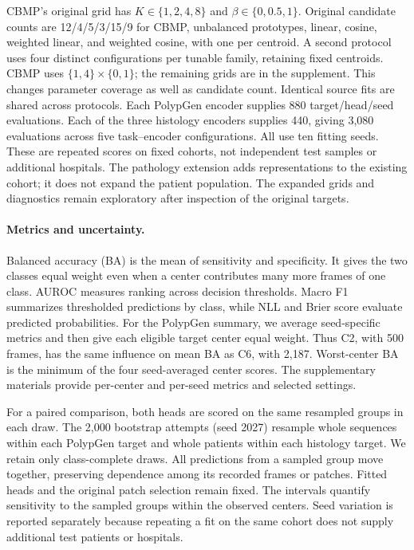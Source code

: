 CBMP's original grid has $K\in\{1,2,4,8\}$ and $\beta\in\{0,0.5,1\}$. Original candidate counts are 12/4/5/3/15/9 for CBMP, unbalanced prototypes, linear, cosine, weighted linear, and weighted cosine, with one per centroid. A second protocol uses four distinct configurations per tunable family, retaining fixed centroids. CBMP uses $\{1,4\}\times\{0,1\}$; the remaining grids are in the supplement. This changes parameter coverage as well as candidate count. Identical source fits are shared across protocols. Each PolypGen encoder supplies 880 target/head/seed evaluations. Each of the three histology encoders supplies 440, giving 3,080 evaluations across five task--encoder configurations. All use ten fitting seeds. These are repeated scores on fixed cohorts, not independent test samples or additional hospitals. The pathology extension adds representations to the existing cohort; it does not expand the patient population. The expanded grids and diagnostics remain exploratory after inspection of the original targets.

\paragraph{Metrics and uncertainty.}
Balanced accuracy (BA) is the mean of sensitivity and specificity. It gives the two classes equal weight even when a center contributes many more frames of one class. AUROC measures ranking across decision thresholds. Macro F1 summarizes thresholded predictions by class, while NLL and Brier score evaluate predicted probabilities. For the PolypGen summary, we average seed-specific metrics and then give each eligible target center equal weight. Thus C2, with 500 frames, has the same influence on mean BA as C6, with 2,187. Worst-center BA is the minimum of the four seed-averaged center scores. The supplementary materials provide per-center and per-seed metrics and selected settings.

For a paired comparison, both heads are scored on the same resampled groups in each draw. The 2,000 bootstrap attempts (seed 2027) resample whole sequences within each PolypGen target and whole patients within each histology target. We retain only class-complete draws. All predictions from a sampled group move together, preserving dependence among its recorded frames or patches. Fitted heads and the original patch selection remain fixed. The intervals quantify sensitivity to the sampled groups within the observed centers. Seed variation is reported separately because repeating a fit on the same cohort does not supply additional test patients or hospitals.

